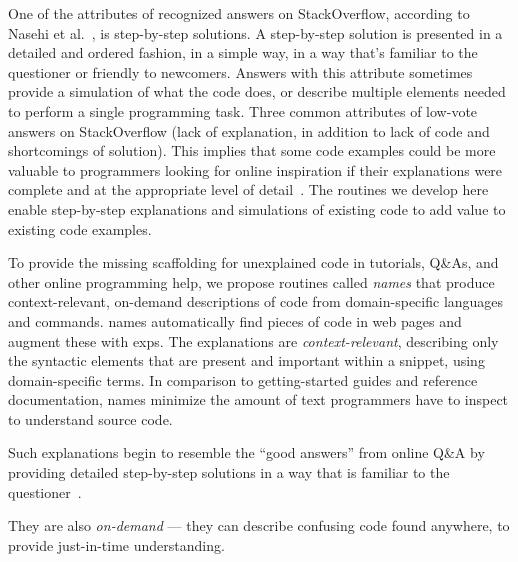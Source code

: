 \begin{changes}
One of the attributes of recognized answers on StackOverflow, according to Nasehi et al.~\cite{nasehi_what_2012}, is step-by-step solutions.
A step-by-step solution is presented in a detailed and ordered fashion, in a simple way, in a way that's familiar to the questioner or friendly to newcomers.
Answers with this attribute sometimes provide a simulation of what the code does, or describe multiple elements needed to perform a single programming task. 
Three common attributes of low-vote answers on StackOverflow (lack of explanation, in addition to lack of code and shortcomings of solution).
This implies that some code examples could be more valuable to programmers looking for online inspiration if their explanations were complete and at the appropriate level of detail~\cite{nasehi_what_2012}.
\fi
The routines we develop here enable step-by-step explanations and simulations of existing code to add value to existing code examples.
\end{changes}
\fi

To provide the missing scaffolding for unexplained code in tutorials, Q\&As, and other online programming help, we propose routines called \emph{\glspl{name}} that produce context-relevant, on-demand descriptions of code from domain-specific languages and commands.
\Glspl{name} automatically find pieces of code in web pages and augment these with \glspl{exp}.
The explanations are \emph{context-relevant}, describing only the syntactic elements that are present and important within a snippet, using domain-specific terms.
In comparison to getting-started guides and reference documentation, \glspl{name} minimize the amount of text programmers have to inspect to understand source code.
\begin{changes}
Such explanations begin to resemble the ``good answers'' from online Q\&A by providing detailed step-by-step solutions in a way that is familiar to the questioner~\cite{nasehi_what_2012}.
\end{changes}
They are also \emph{on-demand} --- they can describe confusing code found anywhere, to provide just-in-time understanding.

